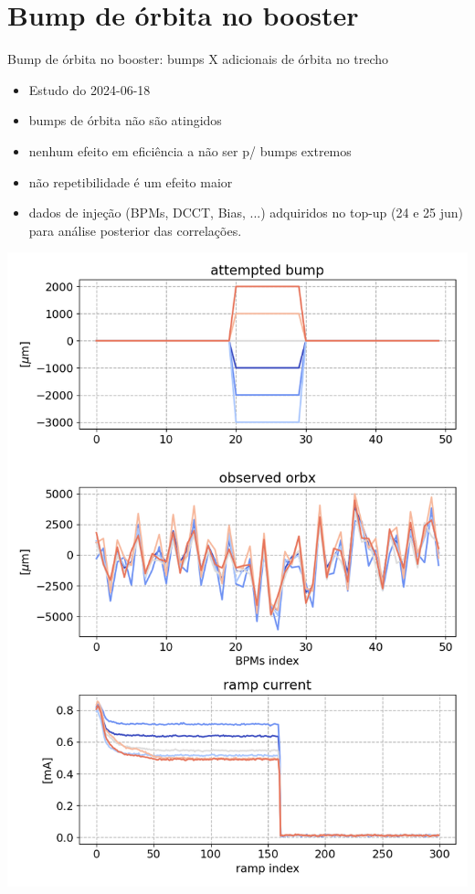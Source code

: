\section{Bump de órbita no booster}



\begin{frame}{Bump de órbita no booster: bumps X adicionais de órbita no trecho}
\begin{minipage}{0.49\textwidth}
{\footnotesize
\begin{itemize}
    \item Estudo do 2024-06-18 \href{https://cnpemcamp.sharepoint.com/:b:/s/FAC/EVB6kJl7jAZHgoUxKpIutQABaUAl3s8RLa3O1rui_7JApg?e=V9X4Yf}{}
    \item bumps de órbita não são atingidos
    \item nenhum efeito em eficiência a não ser p/ bumps extremos
    \item não repetibilidade é um efeito maior
    \item dados de injeção (BPMs, DCCT, Bias, ...) adquiridos no top-up (24 e 25 jun) para análise posterior das correlações.
\end{itemize}
}
\end{minipage}
\begin{minipage}{0.49\textwidth}
    \includegraphics[height=0.9\textheight]{2024-07-12/figures/orbits_and_rampcurr_vs_bumps.png}
\end{minipage} 
\end{frame}


